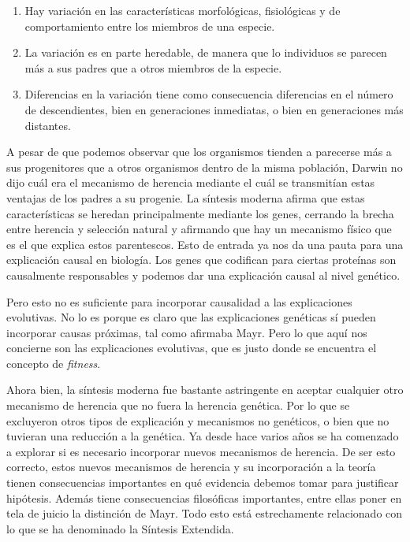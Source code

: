 \begin{enumerate}
  \item Hay variación en las características morfológicas, fisiológicas y de comportamiento entre los miembros de una especie.
  \item La variación es en parte heredable, de manera que lo individuos se parecen más a sus padres que a otros miembros de la especie.
  \item Diferencias en la variación tiene como consecuencia diferencias en el número de descendientes, bien en generaciones inmediatas, o bien en generaciones más distantes\cite{Godfrey-Smith2013}.
\end{enumerate}

A pesar de que podemos observar que los organismos tienden a parecerse más a sus progenitores que a otros organismos dentro de la misma población, Darwin no dijo cuál era el mecanismo de herencia mediante el cuál se transmitían estas ventajas de los padres a su progenie. La síntesis moderna afirma que estas características se heredan principalmente mediante los genes, cerrando la brecha entre herencia y selección natural y afirmando que hay un mecanismo físico que es el que explica estos parentescos. Esto de entrada ya nos da una pauta para una explicación causal en biología. Los genes que codifican para ciertas proteínas son causalmente responsables y podemos dar una explicación causal al nivel genético.

Pero esto no es suficiente para incorporar causalidad a las explicaciones evolutivas. No lo es porque es claro que las explicaciones genéticas sí pueden incorporar causas próximas, tal como afirmaba Mayr. Pero lo que aquí nos concierne son las explicaciones evolutivas, que es justo donde se encuentra el concepto de \emph{fitness}.

Ahora bien, la síntesis moderna fue bastante astringente en aceptar cualquier otro mecanismo de herencia que no fuera la herencia genética. Por lo que se excluyeron otros tipos de explicación y mecanismos no genéticos, o bien que no tuvieran una reducción a la genética. Ya desde hace varios años se ha comenzado a explorar si es necesario incorporar nuevos mecanismos de herencia. De ser esto correcto, estos nuevos mecanismos de herencia y su incorporación a la teoría tienen consecuencias importantes en qué evidencia debemos tomar para justificar hipótesis. Además tiene consecuencias filosóficas importantes, entre ellas poner en tela de juicio la distinción de Mayr. Todo esto está estrechamente relacionado con lo que se ha denominado la Síntesis Extendida.

